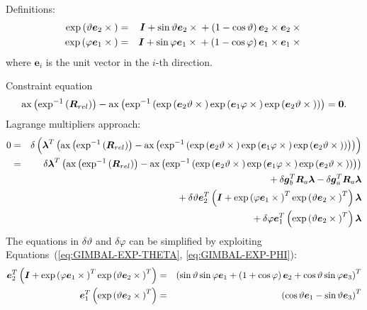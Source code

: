 \documentclass[10pt,dvips]{report}
\newcommand{\T}[1]{\boldsymbol{#1}}
\begin{document}
\noindent
Definitions:
\begin{eqnarray}
	\llk{exp}\plbr{\vartheta \T{e}_2 \times{}} & = &
		\T{I} + \sin\vartheta \T{e}_2\times{}
			+ \plbr{1 - \cos\vartheta}\T{e}_2\times\T{e}_2\times{}
		\label{eq:GIMBAL-EXP-THETA} \\
	\llk{exp}\plbr{\varphi \T{e}_1 \times{}} & = &
		\T{I} + \sin\varphi \T{e}_1\times{}
			+ \plbr{1 - \cos\varphi}\T{e}_1\times\T{e}_1\times{}
		\label{eq:GIMBAL-EXP-PHI}
\end{eqnarray}
where $\T{e}_i$ is the unit vector in the $i$-th direction.

\noindent
Constraint equation
\begin{equation}
	\llk{ax}\plbr{\llk{exp}^{-1}\plbr{\T{R}_{rel}}}
	- \llk{ax}\plbr{\llk{exp}^{-1}\plbr{
		\llk{exp}\plbr{\T{e}_2 \vartheta \times{}}
		\llk{exp}\plbr{\T{e}_1 \varphi \times{}}
		\llk{exp}\plbr{\T{e}_2 \vartheta \times{}}
	}} = \T{0}.
	\label{eq:GIMBAL-CONSTRAINT}
\end{equation}
Lagrange multipliers approach:
\begin{eqnarray*}
	0 & = & \delta\plbr{\T{\lambda}^T\plbr{
	\llk{ax}\plbr{\llk{exp}^{-1}\plbr{\T{R}_{rel}}}
	- \llk{ax}\plbr{\llk{exp}^{-1}\plbr{
		\llk{exp}\plbr{\T{e}_2 \vartheta \times{}}
		\llk{exp}\plbr{\T{e}_1 \varphi \times{}}
		\llk{exp}\plbr{\T{e}_2 \vartheta \times{}}
	}}
	}} \\
	& = & \delta\T{\lambda}^T \plbr{
	\llk{ax}\plbr{\llk{exp}^{-1}\plbr{\T{R}_{rel}}}
	- \llk{ax}\plbr{\llk{exp}^{-1}\plbr{
		\llk{exp}\plbr{\T{e}_2 \vartheta \times{}}
		\llk{exp}\plbr{\T{e}_1 \varphi \times{}}
		\llk{exp}\plbr{\T{e}_2 \vartheta \times{}}
	}}
	} \\
	& & \mbox{} + \delta\T{g}_b^T \T{R}_a \T{\lambda}
	- \delta\T{g}_a^T \T{R}_a \T{\lambda} \\
	& & \mbox{} + \delta\vartheta \T{e}_2^T \plbr{
		\T{I} + \llk{exp}\plbr{\varphi \T{e}_1 \times{}}^T
			\llk{exp}\plbr{\vartheta \T{e}_2 \times{}}^T
	} \T{\lambda} \\
	& & \mbox{} + \delta\varphi \T{e}_1^T \plbr{
		\llk{exp}\plbr{\vartheta \T{e}_2 \times{}}^T
	} \T{\lambda}
\end{eqnarray*}
The equations in $\delta\vartheta $ and $\delta\varphi$ can be simplified
by exploiting Equations~(\ref{eq:GIMBAL-EXP-THETA}, \ref{eq:GIMBAL-EXP-PHI}):
\begin{eqnarray*}
	\T{e}_2^T \plbr{
		\T{I} + \llk{exp}\plbr{\varphi \T{e}_1 \times{}}^T
			\llk{exp}\plbr{\vartheta \T{e}_2 \times{}}^T
	} & = & \plbr{
		\sin\vartheta \sin\varphi \T{e}_1
		+ \plbr{1 + \cos\varphi} \T{e}_2 
		+ \cos\vartheta\sin\varphi \T{e}_3
	}^T \\
	\T{e}_1^T \plbr{
		\llk{exp}\plbr{\vartheta \T{e}_2 \times{}}^T
	} & = & \plbr{
		\cos\vartheta \T{e}_1 - \sin\vartheta \T{e}_3
	}^T 
\end{eqnarray*}
\end{document}
